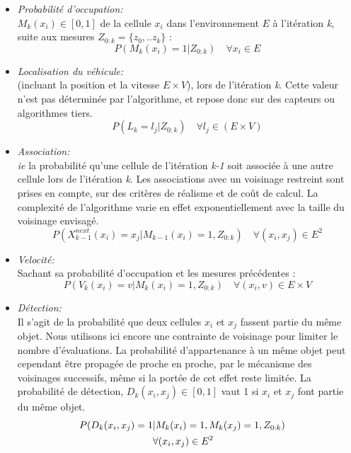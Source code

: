 \begin{itemize}
	\item{\emph{Probabilité d'occupation:\\}}
	$M_k (x_i) \in [0,1]$ de la cellule $x_i$ dans l'environnement $E$  à l'itération \emph{k}, suite aux mesures $Z_{0:k} = \{z_0,.. z_k \}$ :
	\begin{equation}
	P(M_k(x_i)=1 | Z_{0:k} ) \quad \forall{x_i} \in E
	\end{equation}
	
	\item{\emph{Localisation du véhicule:\\}}
	(incluant la position et la vitesse $E \times V$), lors de l'itération \emph{k}. Cette valeur n'est pas déterminée par l'algorithme, et repose donc sur des capteurs ou algorithmes tiers. 
	\begin{equation}
	P(L_k=l_j | Z_{0:k}) \quad \forall{l_j} \in  ( E \times V ) 
	\end{equation}
	
	\item{\emph{Association:\\}}
	\emph{ie} la probabilité qu'une cellule de l'itération \emph{k-1} soit associée à une autre cellule lors de l'itération \emph{k}. Les associations avec un voisinage restreint sont prises en compte, sur des critères de réalisme et de coût de calcul. La complexité de l'algorithme varie en effet exponentiellement avec la taille du voisinage envisagé.
	\begin{equation}
	P(X_{k-1}^{next} (x_i) = x_j | M_{k-1} (x_i) = 1, Z_{0:k}) \quad \forall (x_i, x_j) \in E^2 
	\end{equation}
	
	\item{\emph{Velocité:\\}}
	Sachant sa probabilité d'occupation et les mesures précédentes :
	\begin{equation}
	P(V_{k} (x_i) = v | M_{k}(x_i) = 1, Z_{0:k}) \quad \forall (x_i, v) \in E \times V
	\end{equation}
	
	\item{\emph{Détection:\\}} 
	Il s'agit de la probabilité que deux cellules $x_i$ et $x_j$ fassent partie du même objet. Nous utilisons ici encore une contrainte de voisinage pour limiter le nombre d'évaluations. La probabilité d'appartenance à un même objet peut cependant être propagée de proche en proche, par le mécanisme des voisinages successifs, même si la portée de cet effet reste limitée. La probabilité de détection, $D_k(x_i, x_j) \in [0,1]$ vaut 1 si $x_i$ et $x_j$ font partie du même objet.
	\begin{align}
		P(D_k(x_i, x_j) = 1 &| M_k(x_i) = 1, M_k(x_j) = 1, Z_{0:k}) \quad \notag \\
		&\forall(x_i, x_j) \in E^2
	\end{align}
	

\end{itemize}
